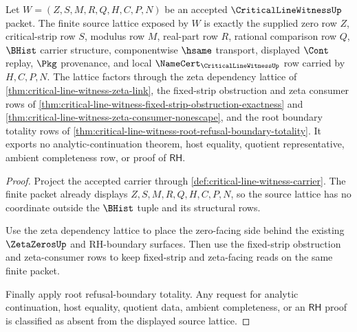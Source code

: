 \begin{theorem}
\label{thm:critical-line-witness-finite-source-lattice-boundary}
Let $W=(Z,S,M,R,Q,H,C,P,N)$ be an accepted $\CriticalLineWitnessUp$ packet. The finite source lattice exposed by $W$ is exactly the supplied zero row $Z$, critical-strip row $S$, modulus row $M$, real-part row $R$, rational comparison row $Q$, $\BHist$ carrier structure, componentwise $\hsame$ transport, displayed $\Cont$ replay, $\Pkg$ provenance, and local $\NameCert_{\CriticalLineWitnessUp}$ row carried by $H,C,P,N$. The lattice factors through the zeta dependency lattice of \autoref{thm:critical-line-witness-zeta-link}, the fixed-strip obstruction and zeta consumer rows of \autoref{thm:critical-line-witness-fixed-strip-obstruction-exactness} and \autoref{thm:critical-line-witness-zeta-consumer-nonescape}, and the root boundary totality rows of \autoref{thm:critical-line-witness-root-refusal-boundary-totality}. It exports no analytic-continuation theorem, host equality, quotient representative, ambient completeness row, or proof of $\mathsf{RH}$.
\end{theorem}
\begin{proof}
Project the accepted carrier through \autoref{def:critical-line-witness-carrier}. The finite packet already displays $Z,S,M,R,Q,H,C,P,N$, so the source lattice has no coordinate outside the $\BHist$ tuple and its structural rows.

Use the zeta dependency lattice to place the zero-facing side behind the existing $\ZetaZerosUp$ and RH-boundary surfaces. Then use the fixed-strip obstruction and zeta-consumer rows to keep fixed-strip and zeta-facing reads on the same finite packet.

Finally apply root refusal-boundary totality. Any request for analytic continuation, host equality, quotient data, ambient completeness, or an $\mathsf{RH}$ proof is classified as absent from the displayed source lattice.
\end{proof}

